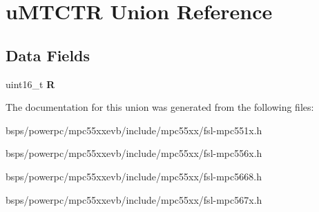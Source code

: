 \hypertarget{unionuMTCTR}{}\section{u\+M\+T\+C\+TR Union Reference}
\label{unionuMTCTR}
\subsection*{Data Fields}
\begin{DoxyCompactItemize}
\item 
\mbox{\label{unionuMTCTR_a2f61a7d9dfd2f273ad3e8e77167081d5}} 
uint16\+\_\+t {\bfseries R}
\end{DoxyCompactItemize}


The documentation for this union was generated from the following files\+:\begin{DoxyCompactItemize}
\item 
bsps/powerpc/mpc55xxevb/include/mpc55xx/fsl-\/mpc551x.\+h\item 
bsps/powerpc/mpc55xxevb/include/mpc55xx/fsl-\/mpc556x.\+h\item 
bsps/powerpc/mpc55xxevb/include/mpc55xx/fsl-\/mpc5668.\+h\item 
bsps/powerpc/mpc55xxevb/include/mpc55xx/fsl-\/mpc567x.\+h\end{DoxyCompactItemize}
